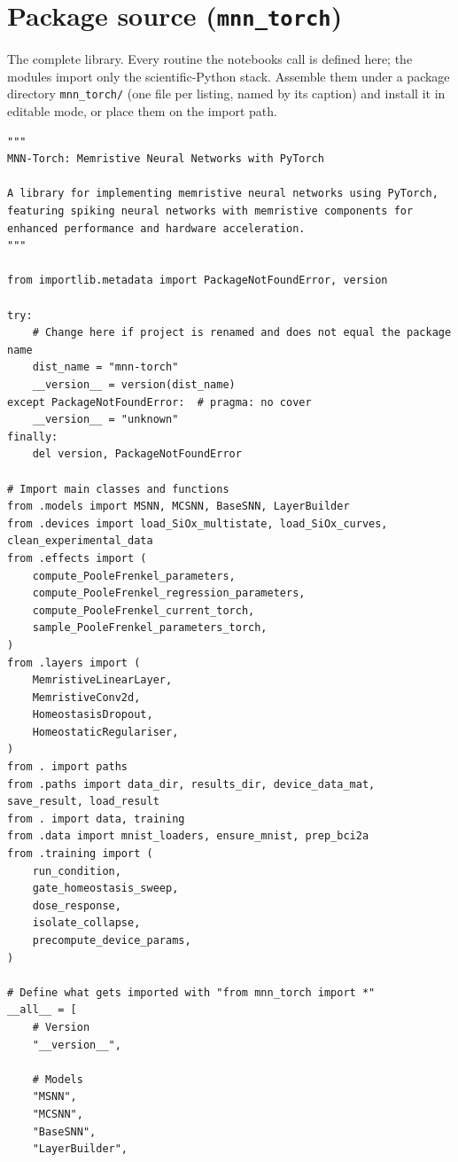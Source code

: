 \section{Package source (\texttt{mnn\_torch})}
\label{app:mnn-src}

\noindent The complete library. Every routine the notebooks call is defined here; the modules import only the scientific-Python stack. Assemble them under a package directory \texttt{mnn\_torch/} (one file per listing, named by its caption) and install it in editable mode, or place them on the import path.

\begin{lstlisting}[caption={mnn\_torch/\_\_init\_\_.py},label={lst:mnn-src-__init__}]
"""
MNN-Torch: Memristive Neural Networks with PyTorch

A library for implementing memristive neural networks using PyTorch,
featuring spiking neural networks with memristive components for
enhanced performance and hardware acceleration.
"""

from importlib.metadata import PackageNotFoundError, version

try:
    # Change here if project is renamed and does not equal the package name
    dist_name = "mnn-torch"
    __version__ = version(dist_name)
except PackageNotFoundError:  # pragma: no cover
    __version__ = "unknown"
finally:
    del version, PackageNotFoundError

# Import main classes and functions
from .models import MSNN, MCSNN, BaseSNN, LayerBuilder
from .devices import load_SiOx_multistate, load_SiOx_curves, clean_experimental_data
from .effects import (
    compute_PooleFrenkel_parameters,
    compute_PooleFrenkel_regression_parameters,
    compute_PooleFrenkel_current_torch,
    sample_PooleFrenkel_parameters_torch,
)
from .layers import (
    MemristiveLinearLayer,
    MemristiveConv2d,
    HomeostasisDropout,
    HomeostaticRegulariser,
)
from . import paths
from .paths import data_dir, results_dir, device_data_mat, save_result, load_result
from . import data, training
from .data import mnist_loaders, ensure_mnist, prep_bci2a
from .training import (
    run_condition,
    gate_homeostasis_sweep,
    dose_response,
    isolate_collapse,
    precompute_device_params,
)

# Define what gets imported with "from mnn_torch import *"
__all__ = [
    # Version
    "__version__",
    
    # Models
    "MSNN",
    "MCSNN", 
    "BaseSNN",
    "LayerBuilder",
    

\end{lstlisting}

